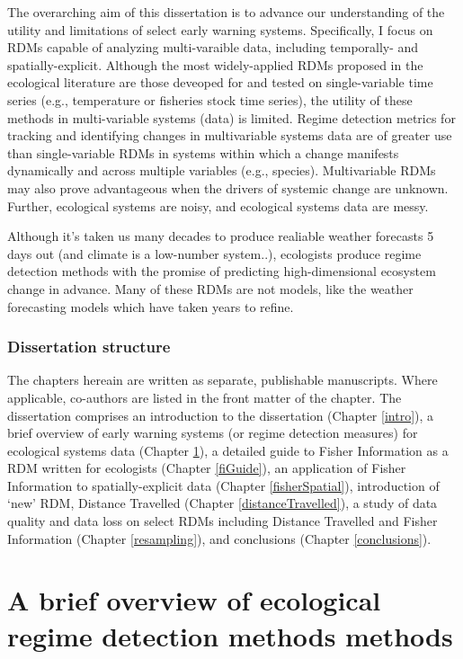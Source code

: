 \documentclass[12pt,twoside,openany]{reedthesis}
\begin{document}
The overarching aim of this dissertation is to advance our understanding
of the utility and limitations of select early warning systems.
Specifically, I focus on RDMs capable of analyzing multi-varaible data,
including temporally- and spatially-explicit. Although the most
widely-applied RDMs proposed in the ecological literature are those
deveoped for and tested on single-variable time series (e.g.,
temperature or fisheries stock time series), the utility of these
methods in multi-variable systems (data) is limited. Regime detection
metrics for tracking and identifying changes in multivariable systems
data are of greater use than single-variable RDMs in systems within
which a change manifests dynamically and across multiple variables
(e.g., species). Multivariable RDMs may also prove advantageous when the
drivers of systemic change are unknown. Further, ecological systems are
noisy, and ecological systems data are messy.

Although it's taken us many decades to produce realiable weather
forecasts 5 days out (and climate is a low-number system..), ecologists
produce regime detection methods with the promise of predicting
high-dimensional ecosystem change in advance. Many of these RDMs are not
models, like the weather forecasting models which have taken years to
refine.

\subsection{Dissertation structure}\label{dissertation-structure}

The chapters hereain are written as separate, publishable manuscripts.
Where applicable, co-authors are listed in the front matter of the
chapter. The dissertation comprises an introduction to the dissertation
(Chapter \ref{intro}), a brief overview of early warning systems (or
regime detection measures) for ecological systems data (Chapter
\ref{rdmReview}), a detailed guide to Fisher Information as a RDM
written for ecologists (Chapter \ref{fiGuide}), an application of Fisher
Information to spatially-explicit data (Chapter \ref{fisherSpatial}),
introduction of `new' RDM, Distance Travelled (Chapter
\ref{distanceTravelled}), a study of data quality and data loss on
select RDMs including Distance Travelled and Fisher Information (Chapter
\ref{resampling}), and conclusions (Chapter \ref{conclusions}).

\chapter{A brief overview of ecological regime detection methods
methods}\label{rdmReview}
\end{document}
